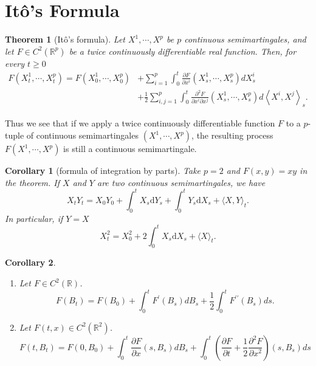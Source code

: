 \documentclass{report}
\newtheorem{corollary}{Corollary}[section]
\newtheorem{theorem}{Theorem}[section]
\theoremstyle{nonumberplain}
\begin{document}
\section{Itô's Formula}
\begin{theorem}[Itô's formula]
	Let $X^{1}, \cdots, X^{p}$ be $p$ continuous semimartingales, and let $F\in C^2(\mathbb{R}^{p})$ be a twice continuously differentiable real function. Then, for every $t \geq 0$
	\[
	\begin{aligned}
	F\left(X_{t}^{1}, \cdots, X_{t}^{p}\right)=F\left(X_{0}^{1}, \cdots, X_{0}^{p}\right) &+\sum_{i=1}^{p} \int_{0}^{t} \frac{\partial F}{\partial x^{i}}\left(X_{s}^{1}, \cdots, X_{s}^{p}\right) d X_{s}^{i} \\
	&+\frac{1}{2} \sum_{i, j=1}^{p} \int_{0}^{t} \frac{\partial^{2} F}{\partial x^{i} \partial x^{j}}\left(X_{s}^{1}, \cdots, X_{s}^{p}\right) d\left\langle X^{i}, X^{j}\right\rangle_{s}.
	\end{aligned}
	\]
\end{theorem}
Thus we see that if we apply a twice continuously differentiable function $F$ to a $p$-tuple of continuous semimartingales $(X^{1}, \cdots, X^{p})$, the resulting process $F(X^{1}, \cdots, X^{p})$ is still a continuous semimartingale.

\begin{corollary}[formula of integration by parts]
	Take $p=2$ and $F(x, y)=x y$ in the theorem. If $X$ and $Y$ are two continuous semimartingales, we have
	\[
	X_{t} Y_{t}=X_{0} Y_{0}+\int_{0}^{t} X_{s} \mathrm{d} Y_{s}+\int_{0}^{t} Y_{s} \mathrm{d} X_{s}+\langle X, Y\rangle_{t}.
	\]
	In particular, if $Y=X$
	\[
	X_{t}^{2}=X_{0}^{2}+2 \int_{0}^{t} X_{s} \mathrm{d} X_{s}+\langle X\rangle_{t}.
	\]
\end{corollary}

\begin{corollary}
	\begin{enumerate}
		\item Let $F\in C^2(\mathbb{R})$.
		$$F\left(B_{t}\right)=F\left(B_{0}\right)+\int_{0}^{t} F^{\prime}\left(B_{s}\right) d B_{s}+\frac{1}{2} \int_{0}^{t} F^{\prime \prime}\left(B_{s}\right) d s.$$
		\item Let $F(t,x)\in C^2(\mathbb{R}^2)$.
		\[
		F\left(t, B_{t}\right)=F\left(0, B_{0}\right)+\int_{0}^{t} \frac{\partial F}{\partial x}\left(s, B_{s}\right) d B_{s}+\int_{0}^{t}\left(\frac{\partial F}{\partial t}+\frac{1}{2} \frac{\partial^{2} F}{\partial x^{2}}\right)\left(s, B_{s}\right) d s
		\]
	\end{enumerate}
	
	
\end{corollary}
\end{document}
